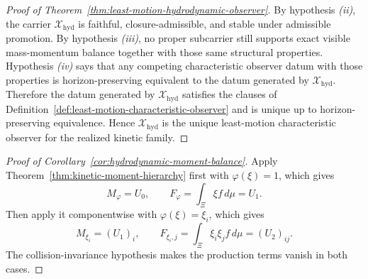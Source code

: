\begin{proof}[Proof of Theorem~\ref{thm:least-motion-hydrodynamic-observer}]
\label{proof:thm:least-motion-hydrodynamic-observer}
By hypothesis \emph{(ii)}, the carrier \(\mathcal X_{\mathrm{hyd}}\) is
faithful, closure-admissible, and stable under admissible promotion. By
hypothesis \emph{(iii)}, no proper subcarrier still supports exact visible
mass-momentum balance together with those same structural properties.
Hypothesis \emph{(iv)} says that any competing characteristic observer datum
with those properties is horizon-preserving equivalent to the datum generated
by \(\mathcal X_{\mathrm{hyd}}\). Therefore the datum generated by
\(\mathcal X_{\mathrm{hyd}}\) satisfies the clauses of
Definition~\ref{def:least-motion-characteristic-observer} and is unique up to
horizon-preserving equivalence. Hence \(\mathcal X_{\mathrm{hyd}}\) is the
unique least-motion characteristic observer for the realized kinetic family.
\end{proof}

\begin{proof}[Proof of Corollary~\ref{cor:hydrodynamic-moment-balance}]
\label{proof:cor:hydrodynamic-moment-balance}
Apply Theorem~\ref{thm:kinetic-moment-hierarchy} first with
\(\varphi(\xi)=1\), which gives
\[
M_\varphi=U_0,
\qquad
F_\varphi=\int_\Xi \xi f\,d\mu = U_1.
\]
Then apply it componentwise with \(\varphi(\xi)=\xi_i\), which gives
\[
M_{\xi_i}=(U_1)_i,
\qquad
F_{\xi_i,j}=\int_\Xi \xi_i\xi_j f\,d\mu=(U_2)_{ij}.
\]
The collision-invariance hypothesis makes the production terms vanish in both
cases.
\end{proof}

